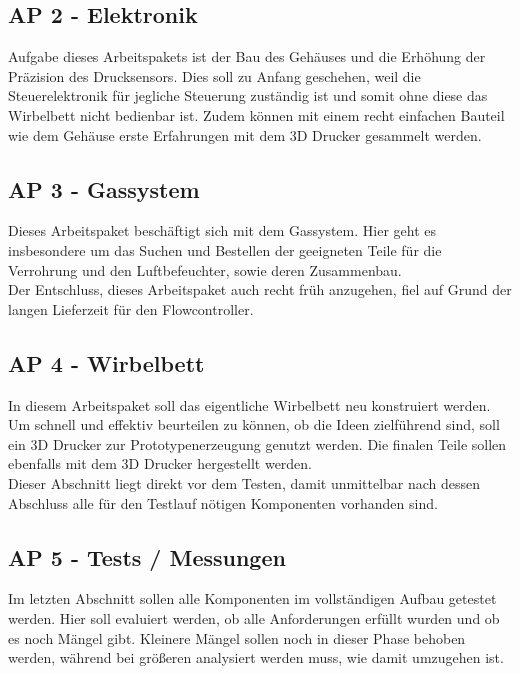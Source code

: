 \subsection{AP 2 - Elektronik}

Aufgabe dieses Arbeitspakets ist der Bau des Gehäuses und die Erhöhung der Präzision des Drucksensors. Dies soll zu Anfang geschehen, weil die Steuerelektronik für jegliche Steuerung zuständig ist und somit ohne diese das Wirbelbett nicht bedienbar ist. Zudem können mit einem recht einfachen Bauteil wie dem Gehäuse erste Erfahrungen mit dem 3D Drucker gesammelt werden.

\subsection{AP 3 - Gassystem}

Dieses Arbeitspaket beschäftigt sich mit dem Gassystem. Hier geht es insbesondere um das Suchen und Bestellen der geeigneten Teile für die Verrohrung und den Luftbefeuchter, sowie deren Zusammenbau. \\
Der Entschluss, dieses Arbeitspaket auch recht früh anzugehen, fiel auf Grund der langen Lieferzeit für den Flowcontroller. 

\subsection{AP 4 - Wirbelbett}

In diesem Arbeitspaket soll das eigentliche Wirbelbett neu konstruiert werden. Um schnell und effektiv beurteilen zu können, ob die Ideen zielführend sind, soll ein 3D Drucker zur Prototypenerzeugung genutzt werden. Die finalen Teile sollen ebenfalls mit dem 3D Drucker hergestellt werden. \\
Dieser Abschnitt liegt direkt vor dem Testen, damit unmittelbar nach dessen Abschluss alle für den Testlauf nötigen Komponenten vorhanden sind.


\subsection{AP 5 - Tests / Messungen}

Im letzten Abschnitt sollen alle Komponenten im vollständigen Aufbau getestet werden. Hier soll evaluiert werden, ob alle Anforderungen erfüllt wurden und ob es noch Mängel gibt. Kleinere Mängel sollen noch in dieser Phase behoben werden, während bei größeren analysiert werden muss, wie damit umzugehen ist.


